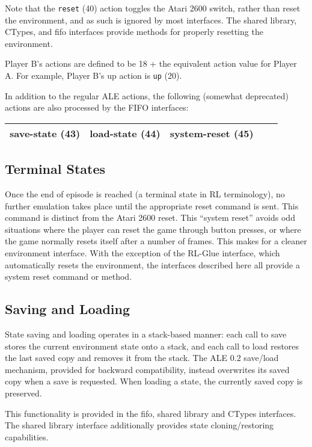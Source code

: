 \documentclass[12pt]{article}
\begin{document}
Note that the \verb+reset+ (40) action toggles the Atari 2600 switch, rather than reset the 
environment, and as such is ignored by most interfaces. The shared library, CTypes, and fifo
interfaces provide methods for properly resetting the environment. 

Player B's actions are defined to be 18 + the equivalent action value for Player A. For example, Player B's up action is \verb+up+ (20). 

In addition to the regular ALE actions, the following (somewhat deprecated) actions are also processed by the 
FIFO interfaces:

\begin{center}
\begin{tabular}{|r|r|r|r|r|}
\hline
save-state (43) & load-state (44) & system-reset (45) \\
\hline
\end{tabular}
\end{center}

\subsection{Terminal States}

Once the end of episode is reached (a terminal state in RL terminology), no further emulation 
takes place until the appropriate reset command is sent. This command is distinct from the Atari 
2600 reset. This ``system reset'' avoids odd situations where the player can reset the game
through button presses, or where the game normally resets itself after a number of frames. This 
makes for a cleaner environment interface. With the exception of the RL-Glue interface, which 
automatically resets the environment, the interfaces described here all provide a system reset
command or method.

\subsection{Saving and Loading} 

State saving and loading operates in a stack-based manner: each call to save stores the current
environment state onto a stack, and each call to load restores the last saved copy and removes
it from the stack. The ALE 0.2 save/load mechanism, provided for backward compatibility, instead
overwrites its saved copy when a save is requested. When loading a state, the currently saved copy
is preserved. 

This functionality is provided in the fifo, shared library and CTypes interfaces. The shared
library interface additionally provides state cloning/restoring capabilities.
\end{document}
